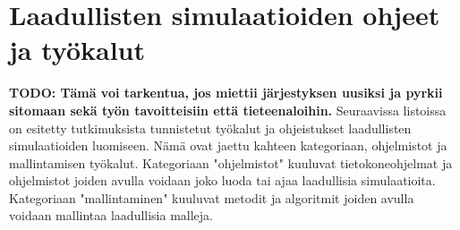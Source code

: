 \documentclass[utf8]{gradu3}
\begin{document}
\clearpage
\section{Laadullisten simulaatioiden ohjeet ja työkalut} \label{tyokalut}
\textbf{TODO: Tämä voi tarkentua, jos miettii järjestyksen uusiksi ja pyrkii sitomaan sekä työn tavoitteisiin että tieteenaloihin.}
Seuraavissa listoissa on esitetty tutkimuksista tunnistetut työkalut ja ohjeistukset laadullisten simulaatioiden luomiseen. Nämä ovat jaettu kahteen kategoriaan, ohjelmistot ja mallintamisen työkalut. Kategoriaan "ohjelmistot" kuuluvat tietokoneohjelmat ja ohjelmistot joiden avulla voidaan joko luoda tai ajaa laadullisia simulaatioita.
Kategoriaan "mallintaminen" kuuluvat metodit ja algoritmit joiden avulla voidaan mallintaa laadullisia malleja.
\end{document}
